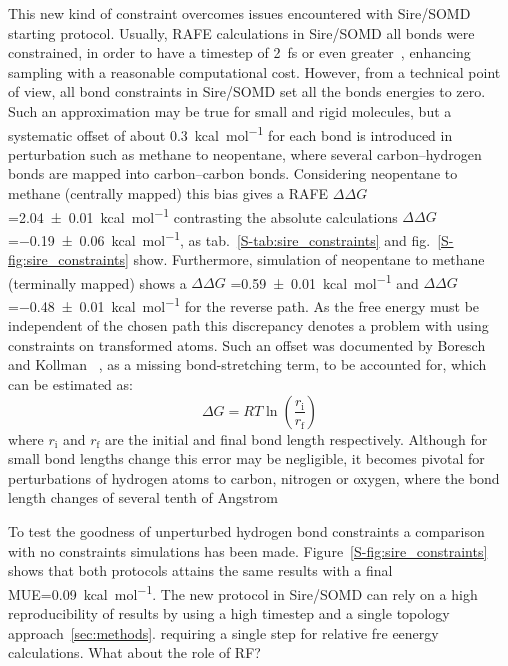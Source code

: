 \documentclass[journal=jctcce,manuscript=article]{achemso}
\begin{document}
This new kind of constraint overcomes issues encountered with Sire/SOMD starting protocol. Usually, RAFE calculations in Sire/SOMD all bonds were constrained, in order to have a timestep of \SI{2}{fs} or even greater~\cite{hopkins2015long}, enhancing sampling with a reasonable computational cost.
However, from a technical point of view, all bond constraints in Sire/SOMD set all the bonds energies to zero. Such an approximation may be true for small and rigid molecules, but a systematic offset of about \SI{0.3}{kcal.mol^{-1}} for each bond is introduced in perturbation such as methane to neopentane, where several carbon--hydrogen bonds are mapped into carbon--carbon bonds.
Considering neopentane to methane (centrally mapped) this bias gives a RAFE $\Delta\Delta G$=\SI{2.04 +- 0.01}{kcal.mol^{-1}} contrasting the absolute calculations $\Delta\Delta G$=\SI{-0.19 +- 0.06}{kcal.mol^{-1}}, as tab.~\ref{S-tab:sire_constraints} and fig.~\ref{S-fig:sire_constraints} show.
Furthermore, simulation of neopentane to methane (terminally mapped) shows a $\Delta\Delta G$ =\SI{0.59 +- 0.01}{kcal.mol^{-1}} and $\Delta\Delta G$ =\SI{-0.48 +- 0.01}{kcal.mol^{-1}} for the reverse path. As the free energy must be independent of the chosen path this discrepancy denotes a problem with using constraints on transformed atoms. 
Such an offset was documented by Boresch and Kollman ~\cite{pearlman1991overlookeds, doi:10.1021/jp981628n,doi:10.1021/jp981629f}, as a missing bond-stretching term, to be accounted for, which can be estimated as: 
\begin{equation}
 \label{eq:allbondserror}
 \Delta G= RT\ln \left ( \frac{r_{\mathrm{i}}}{r_\mathrm{f}} \right)  
\end{equation}
where $r_{\mathrm{i}}$ and $r_{\mathrm{f}}$ are the initial and final bond length respectively. Although for small bond lengths change this error may be negligible, it becomes pivotal for perturbations of  hydrogen atoms to carbon, nitrogen or oxygen, where the bond length changes of several tenth of Angstrom

To test the goodness of unperturbed hydrogen bond constraints a comparison with no constraints simulations has been made. Figure~\ref{S-fig:sire_constraints} shows that both protocols attains the same results with a final MUE=\SI{0.09}{kcal.mol^{-1}}.
The new protocol in Sire/SOMD can rely on a high reproducibility of results by using a high timestep and a single topology approach~\ref{sec:methods}.
requiring a single step for relative fre eenergy calculations.
What about the role of RF?
\end{document}
